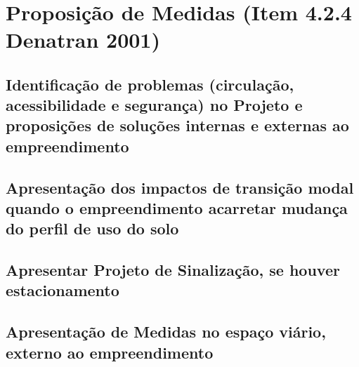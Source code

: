 \documentclass[]{article}
\begin{document}
~

\hypertarget{proposiuxe7uxe3o-de-medidas-item-4.2.4-denatran-2001}{%
\section{Proposição de Medidas (Item 4.2.4 Denatran
2001)}\label{proposiuxe7uxe3o-de-medidas-item-4.2.4-denatran-2001}}

\hypertarget{identificauxe7uxe3o-de-problemas-circulauxe7uxe3o-acessibilidade-e-seguranuxe7a-no-projeto-e-proposiuxe7uxf5es-de-soluuxe7uxf5es-internas-e-externas-ao-empreendimento}{%
\subsection{Identificação de problemas (circulação, acessibilidade e
segurança) no Projeto e proposições de soluções internas e externas ao
empreendimento}\label{identificauxe7uxe3o-de-problemas-circulauxe7uxe3o-acessibilidade-e-seguranuxe7a-no-projeto-e-proposiuxe7uxf5es-de-soluuxe7uxf5es-internas-e-externas-ao-empreendimento}}

\hypertarget{apresentauxe7uxe3o-dos-impactos-de-transiuxe7uxe3o-modal-quando-o-empreendimento-acarretar-mudanuxe7a-do-perfil-de-uso-do-solo}{%
\subsection{Apresentação dos impactos de transição modal quando o
empreendimento acarretar mudança do perfil de uso do
solo}\label{apresentauxe7uxe3o-dos-impactos-de-transiuxe7uxe3o-modal-quando-o-empreendimento-acarretar-mudanuxe7a-do-perfil-de-uso-do-solo}}

\hypertarget{apresentar-projeto-de-sinalizauxe7uxe3o-se-houver-estacionamento}{%
\subsection{Apresentar Projeto de Sinalização, se houver
estacionamento}\label{apresentar-projeto-de-sinalizauxe7uxe3o-se-houver-estacionamento}}

\hypertarget{apresentauxe7uxe3o-de-medidas-no-espauxe7o-viuxe1rio-externo-ao-empreendimento}{%
\subsection{Apresentação de Medidas no espaço viário, externo ao
empreendimento}\label{apresentauxe7uxe3o-de-medidas-no-espauxe7o-viuxe1rio-externo-ao-empreendimento}}
\end{document}
